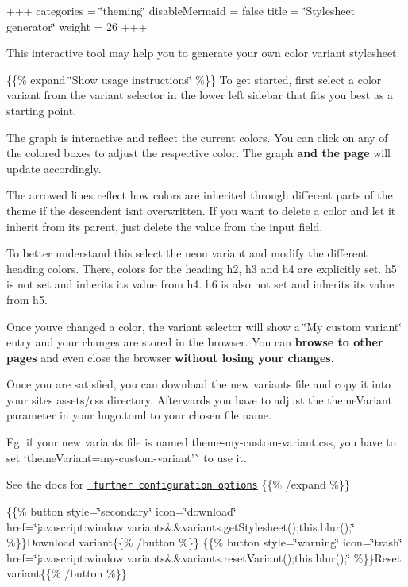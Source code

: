+++ categories = \char`\"{}theming\char`\"{} disable\+Mermaid = false title = \char`\"{}\+Stylesheet generator\char`\"{} weight = 26 +++

This interactive tool may help you to generate your own color variant stylesheet.

\{\{\% expand \char`\"{}\+Show usage instructions\char`\"{} \%\}\} To get started, first select a color variant from the variant selector in the lower left sidebar that fits you best as a starting point.

The graph is interactive and reflect the current colors. You can click on any of the colored boxes to adjust the respective color. The graph {\bfseries{and the page}} will update accordingly.

The arrowed lines reflect how colors are inherited through different parts of the theme if the descendent isn\textquotesingle{}t overwritten. If you want to delete a color and let it inherit from its parent, just delete the value from the input field.

To better understand this select the {\ttfamily neon} variant and modify the different heading colors. There, colors for the heading {\ttfamily h2}, {\ttfamily h3} and {\ttfamily h4} are explicitly set. {\ttfamily h5} is not set and inherits its value from {\ttfamily h4}. {\ttfamily h6} is also not set and inherits its value from {\ttfamily h5}.

Once you\textquotesingle{}ve changed a color, the variant selector will show a \char`\"{}\+My custom variant\char`\"{} entry and your changes are stored in the browser. You can {\bfseries{browse to other pages}} and even close the browser {\bfseries{without losing your changes}}.

Once you are satisfied, you can download the new variants file and copy it into your site\textquotesingle{}s {\ttfamily assets/css} directory. Afterwards you have to adjust the {\ttfamily theme\+Variant} parameter in your {\ttfamily hugo.\+toml} to your chosen file name.

Eg. if your new variants file is named {\ttfamily theme-\/my-\/custom-\/variant.\+css}, you have to set `theme\+Variant=\textquotesingle{}my-\/custom-\/variant'\`{} to use it.

See the docs for \href{basics/branding}{\texttt{ further configuration options}} \{\{\% /expand \%\}\}

\{\{\% button style=\char`\"{}secondary\char`\"{} icon=\char`\"{}download\char`\"{} href=\char`\"{}javascript\+:window.\+variants\&\&variants.\+get\+Stylesheet();this.\+blur();\char`\"{} \%\}\}Download variant\{\{\% /button \%\}\} \{\{\% button style=\char`\"{}warning\char`\"{} icon=\char`\"{}trash\char`\"{} href=\char`\"{}javascript\+:window.\+variants\&\&variants.\+reset\+Variant();this.\+blur();\char`\"{} \%\}\}Reset variant\{\{\% /button \%\}\}

